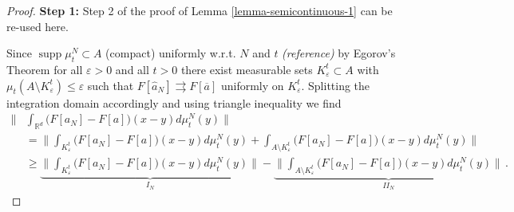 \documentclass[A4paper,11pt]{article}
\theoremstyle{definition}
\newcommand{\R}{\mathbb{R}}
\DeclareMathOperator{\supp}{supp}
\begin{document}
\begin{proof}
	{\bf Step 1:}
	Step 2 of the proof of Lemma \ref{lemma-semicontinuous-1} can be re-used here.
	
	Since $\supp\mu_t^N\subset A$ (compact) uniformly w.r.t. $N$ and $t$ {\it (reference)} by Egorov's
	Theorem for all $\varepsilon>0$ and all $t>0$ there exist measurable sets $K_\varepsilon^t\subset A$ with
	$\mu_t(A\setminus K_\varepsilon^t)\leq\varepsilon$ such that
	$F[\widehat a_N]\rightrightarrows F[\overline a]$ uniformly on $K_\varepsilon^t$. Splitting the integration
	domain accordingly and using triangle inequality we find
	\begin{align*}
		\Biggl\|
			&\int_{\R^d}\bigl(F[a_N]-F[a]\bigr)(x-y)d\mu_t^N(y)\Biggr\|\\
			&=\Biggl\|\int_{K_\varepsilon^t}\bigl(F[a_N]-F[a]\bigr)(x-y)d\mu_t^N(y)
				+\int_{A\setminus K_\varepsilon^t}\bigl(F[a_N]-F[a]\bigr)(x-y)d\mu_t^N(y)\Biggr\|\\
			&\geq\underbrace{\Biggl\|\int_{K_\varepsilon^t}
				\bigl(F[a_N]-F[a]\bigr)(x-y)d\mu_t^N(y)\Biggr\|}_{I_N}
				-\underbrace{\Biggl\|\int_{A\setminus K_\varepsilon^t}
					\bigl(F[a_N]-F[a]\bigr)(x-y)d\mu_t^N(y)\Biggr\|}_{II_N}\,.
	\end{align*}
	

\end{proof}
\end{document}
